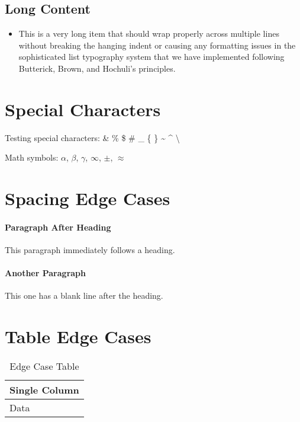 \documentclass[11pt]{article}
\begin{document}
\subsection{Long Content}
\begin{itemize}
\item This is a very long item that should wrap properly across multiple lines without breaking the hanging indent or causing any formatting issues in the sophisticated list typography system that we have implemented following Butterick, Brown, and Hochuli's principles.
\end{itemize}

\section{Special Characters}

Testing special characters: \& \% \$ \# \_ \{ \} \textasciitilde{} \textasciicircum{} \textbackslash{}

Math symbols: $\alpha$, $\beta$, $\gamma$, $\infty$, $\pm$, $\approx$

\section{Spacing Edge Cases}

\paragraph{Paragraph After Heading}
This paragraph immediately follows a heading.

\paragraph{Another Paragraph}

This one has a blank line after the heading.

\section{Table Edge Cases}

\begin{table}[h!] %
  \caption{Edge Case Table}
  \centering
  \begin{tabular}{@{}l@{}}
    \toprule
    Single Column \\
    \midrule
    Data \\
    \bottomrule
  \end{tabular}
\end{table}
\end{document}
